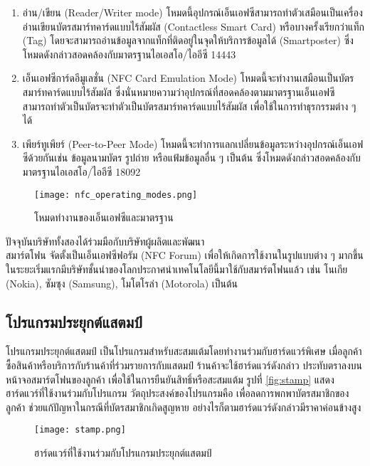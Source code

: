 \documentclass[12pt,a4paper,twocolumn]{article}
\begin{document}
\begin{enumerate}
\item อ่าน/เขียน (Reader/Writer mode) โหมดนี้อุปกรณ์เอ็นเอฟซีสามารถทำตัวเสมือนเป็นเครื่องอ่านเขียนบัตรสมาร์ทคาร์ดแบบไร้สัมผัส (Contactless Smart Card) หรือบางครั้งเรียกว่าแท็ก (Tag) โดยจะสามารถอ่านข้อมูลจากแท็กที่ติดอยู่ในจุดให้บริการข้อมูลได้ (Smartposter) ซึ่งโหมดดังกล่าวสอดคล้องกับมาตรฐานไอเอสโอ/ไออีซี 14443

\item เอ็นเอฟซีการ์ดอีมูเลชั่น (NFC Card Emulation Mode) โหมดนี้จะทำงานเสมือนเป็นบัตรสมาร์ทคาร์ดแบบไร้สัมผัส ซึ่งนั่นหมายความว่าอุปกรณ์ที่สอดคล้องตามมาตรฐานเอ็นเอฟซี สามารถทำตัวเป็นบัตรจะทำตัวเป็นบัตรสมาร์ทคาร์ดแบบไร้สัมผัส เพื่อใช้ในการทำธุรกรรมต่าง ๆ ได้

\item เพียร์ทูเพียร์ (Peer-to-Peer Mode) โหมดนี้จะทำการแลกเปลี่ยนข้อมูลระหว่างอุปกรณ์เอ็นเอฟซีด้วยกันเช่น ข้อมูลนามบัตร รูปถ่าย หรือแฟ้มข้อมูลอื่น ๆ เป็นต้น ซึ่งโหมดดังกล่าวสอดคล้องกับมาตรฐานไอเอสโอ/ไออีซี 18092
\end{enumerate}

\begin{figure}[ht!]
\centering
\texttt{[image: nfc\_operating\_modes.png]}
\caption{โหมดทำงานของเอ็นเอฟซีและมาตรฐาน} \label{fig:nfc}
\label{overflow}
\end{figure}

ปัจจุบันบริษัททั้งสองได้ร่วมมือกับบริษัทผู้ผลิตและพัฒนา\\สมาร์ตโฟน จัดตั้งเป็นเอ็นเอฟซีฟอรัม (NFC Forum) เพื่อให้เกิดการใช้งานในรูปแบบต่าง ๆ มากขึ้น ในระยะเริ่มแรกมีบริษัทชั้นนำของโลกประกาศนำเทคโนโลยีนี้มาใช้กับสมาร์ตโฟนแล้ว เช่น โนเกีย (Nokia), ซัมซุง (Samsung), โมโตโรล่า (Motorola) เป็นต้น

\subsection{โปรแกรมประยุกต์แสตมป์}
โปรแกรมประยุกต์แสตมป์ เป็นโปรแกรมสำหรับสะสมแต้มโดยทำงานร่วมกับฮาร์ดแวร์พิเศษ เมื่อลูกค้าซื้อสินค้าหรือบริการกับร้านค้าที่ร่วมรายการกับแสตมป์ ร้านค้าจะใช้ฮาร์ดแวร์ดังกล่าว ประทับตราลงบนหน้าจอสมาร์ตโฟนของลูกค้า เพื่อใช้ในการยืนยันสิทธิ์หรือสะสมแต้ม รูปที่ \ref{fig:stamp} แสดงฮาร์ดแวร์ที่ใช้งานร่วมกับโปรแกรม วัตถุประสงค์ของโปรแกรมคือ เพื่อลดการพกพาบัตรสมาชิกของลูกค้า ช่วยแก้ปัญหาในกรณีที่บัตรสมาชิกเกิดสูญหาย อย่างไรก็ตามฮาร์ดแวร์ดังกล่าวมีราคาค่อนข้างสูง

\begin{figure}[ht!]
\centering
\texttt{[image: stamp.png]}
\caption{ฮาร์ดแวร์ที่ใช้งานร่วมกับโปรแกรมประยุกต์แสตมป์} \label{fig:stamp}
\label{overflow}
\end{figure}
\end{document}
